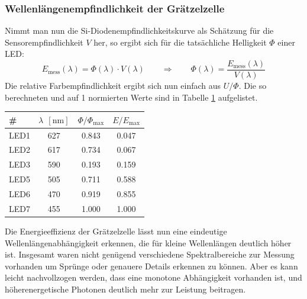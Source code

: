 \documentclass[11pt]{scrartcl}
\newcommand{\unit}[1]{\ensuremath{\,\mathrm{#1}}} %
\begin{document}
\subsubsection{Wellenlängenempfindlichkeit der Grätzelzelle}
Nimmt man nun die Si-Diodenempfindlichkeitskurve als Schätzung für die Sensorempfindlichkeit $V$ her, so ergibt sich für die tatsächliche Helligkeit $\Phi$ einer LED:
\[
E_{\text{mess}}(\lambda) = \Phi(\lambda)\cdot V(\lambda)
\qquad\Rightarrow\qquad
\Phi(\lambda) = \frac{E_{\text{mess}}(\lambda)}{V(\lambda)}
\]
Die relative Farbempfindlichkeit ergibt sich nun einfach aus $U/\Phi$. Die so berechneten und auf 1 normierten Werte sind in Tabelle \ref{lambda_kurve} aufgelistet.
\begin{table}[ht]
\label{lambda_kurve}
\begin{center}\vspace{-\baselineskip}
\begin{tabular}{l|ccc}
\# &
$\lambda\; \unit{[nm]}$ &
$\Phi / \Phi_{\text{max}}$ &
$E/E_{\text{max}}$ \\
\hline
LED1	& 627	& 0.843	& 0.047 \\
LED2	& 617	& 0.734	& 0.067 \\
LED3	& 590	& 0.193	& 0.159 \\
LED5	& 505	& 0.711	& 0.588 \\
LED6	& 470	& 0.919	& 0.855 \\
LED7	& 455	& 1.000	& 1.000
\end{tabular}
\vspace{-\baselineskip}\end{center}
\end{table}
Die Energieeffizienz der Grätzelzelle lässt nun eine eindeutige Wellenlängenabhängigkeit erkennen, die für kleine Wellenlängen deutlich höher ist. Insgesamt waren nicht genügend verschiedene Spektralbereiche zur Messung vorhanden um Sprünge oder genauere Details erkennen zu können. Aber es kann leicht nachvollzogen werden, dass eine monotone Abhängigkeit vorhanden ist, und höherenergetische Photonen deutlich mehr zur Leistung beitragen.
\end{document}
